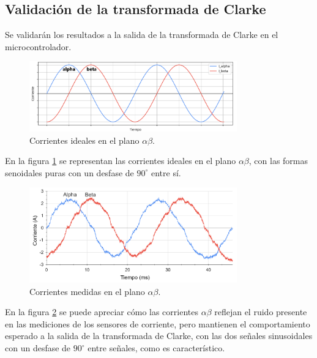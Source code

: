 \documentclass[11pt]{report}
\begin{document}
\newpage
\subsection{Validación de la transformada de Clarke}

Se validarán los resultados a la salida de la transformada de Clarke en el microcontrolador.

\begin{figure}[ht]
	\centering
	\includegraphics[width=0.8\textwidth]{imagenes/graficas/Corrientes_AlphaBeta_ideal.png}
	\caption{Corrientes ideales en el plano $\alpha\beta$.}
	\label{corrientes_alpha_beta_ideal}
\end{figure}
\FloatBarrier

En la figura \ref{corrientes_alpha_beta_ideal} se representan las corrientes ideales en el plano $\alpha\beta$, con las formas senoidales puras con un desfase de $90^\circ$ entre sí.

\begin{figure}[ht]
	\centering
	\includegraphics[width=0.8\textwidth]{imagenes/graficas/Corrientes_AlphaBeta.png}
	\caption{Corrientes medidas en el plano $\alpha\beta$.}
	\label{corrientes_alpha_beta}
\end{figure}
\FloatBarrier

En la figura \ref{corrientes_alpha_beta} se puede apreciar cómo las corrientes $\alpha\beta$ reflejan el ruido presente en las mediciones de los sensores de corriente, pero mantienen el comportamiento esperado a la salida de la transformada de Clarke, con las dos señales sinusoidales con un desfase de $90^\circ$ entre señales, como es característico.
\end{document}
